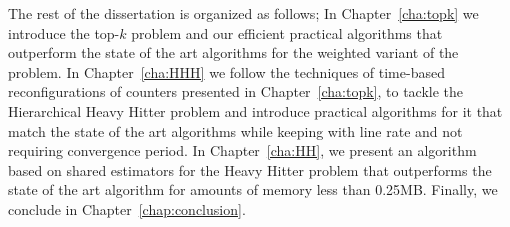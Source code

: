 The rest of the dissertation is organized as follows; In Chapter~\ref{cha:topk} we introduce the top-$k$ problem and our efficient practical algorithms that outperform the state of the art algorithms for the weighted variant of the problem. In Chapter~\ref{cha:HHH} we follow the techniques of time-based reconfigurations of counters presented in Chapter~\ref{cha:topk}, to tackle the Hierarchical Heavy Hitter problem and introduce practical algorithms for it that match the state of the art algorithms while keeping with line rate and not requiring convergence period. In Chapter~\ref{cha:HH}, we present an algorithm based on shared estimators for the Heavy Hitter problem that outperforms the state of the art algorithm for amounts of memory less than 0.25MB. Finally, we conclude in Chapter~\ref{chap:conclusion}.

